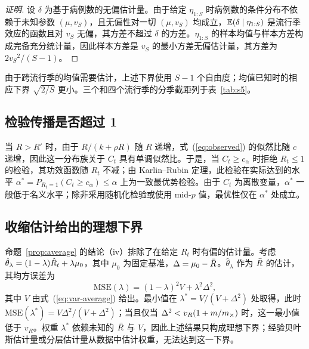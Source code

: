 \begin{proof}[证明]
设 $\delta$ 为基于病例数的无偏估计量。由于给定 $\eta_{1:S}$ 时病例数的条件分布不依赖于未知参数 $(\mu, v_S)$，且无偏性对一切 $(\mu, v_S)$ 均成立，$\mathbb{E}(\delta\mid\eta_{1:S})$ 是流行季效应的函数且对 $v_S$ 无偏，其方差不超过 $\delta$ 的方差。$\eta_{1:S}$ 的样本均值与样本方差构成完备充分统计量，因此样本方差是 $v_S$ 的最小方差无偏估计量，其方差为 $2v_S{}^2/(S-1)$\citep{lehmann1998theory, lehmann2005testing, searle1992variance}。
\end{proof}

由于跨流行季的均值需要估计，上述下界使用 $S-1$ 个自由度；均值已知时的相应下界 $\sqrt{2/S}$ 更小。三个和四个流行季的分季截距列于表~\ref{tab:s5}。

\subsection{检验传播是否超过 1}
\label{app:ump}

当 $R>R'$ 时，由于 $R/(k+\rho R)$ 随 $R$ 递增，式~(\ref{eq:observed}) 的似然比随 $c$ 递增，因此这一分布族关于 $C_t$ 具有单调似然比。于是，当 $C_t\ge c_\alpha$ 时拒绝 $R_t\le1$ 的检验，其功效函数随 $R_t$ 不减；由 Karlin--Rubin 定理，此检验在实际达到的水平 $\alpha^*=P_{R_t=1}(C_t\ge c_\alpha)\le\alpha$ 上为一致最优势检验\citep{karlin1956theory, lehmann2005testing}。由于 $C_t$ 为离散变量，$\alpha^*$ 一般低于名义水平；除非采用随机化检验或使用 mid-$p$ 值，最优性仅在 $\alpha^*$ 处成立。

\subsection{收缩估计给出的理想下界}
\label{app:shrinkage}

命题~\ref{prop:average} 的结论（iv）排除了在给定 $R_t$ 时有偏的估计量。考虑 $\hat{\theta}_\lambda=(1-\lambda)\hat{R}_t+\lambda\mu_0$，其中 $\mu_0$ 为固定基准，$\Delta=\mu_0-\bar{R}$。$\hat{\theta}_\lambda$ 作为 $\bar{R}$ 的估计，其均方误差为
\begin{equation}
  \mathrm{MSE}(\lambda)=(1-\lambda)^2V+\lambda^2\Delta^2,
\end{equation}
其中 $V$ 由式~(\ref{eq:var-average}) 给出。最小值在 $\lambda^*=V/(V+\Delta^2)$ 处取得，此时 $\mathrm{MSE}(\lambda^*)=V\Delta^2/(V+\Delta^2)$；当且仅当 $\Delta^2<v_R(1+m/m_{\times})$ 时，这一最小值低于 $v_R$。权重 $\lambda^*$ 依赖未知的 $\bar{R}$ 与 $V$，因此上述结果只构成理想下界；经验贝叶斯估计量或分层估计量从数据中估计权重，无法达到这一下界\citep{stoner2019hierarchical}。

